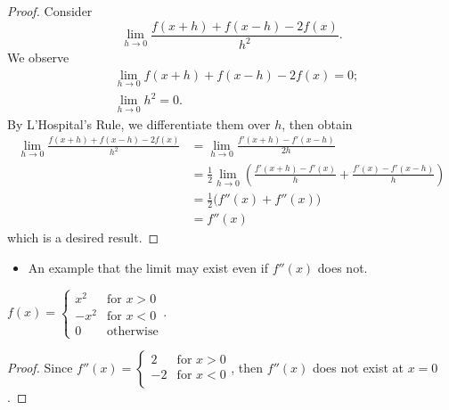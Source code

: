 \begin{Exercise}
	\begin{proof}
		Consider
		$$
		\lim_{h\to 0}\frac{f(x+h) + f(x-h) -2f(x)}{h^2}.
		$$
		We observe
		\begin{align*}
		&\lim_{h\to 0}f(x+h)+f(x-h)-2f(x) = 0; \\
		&\lim_{h\to 0}h^2 =0.
		\end{align*}
		By L'Hospital's Rule, we differentiate them over $h$, then obtain
		\begin{align*}
		\lim_{h\to 0}\frac{f(x+h) + f(x-h) -2f(x)}{h^2}
		&= \lim_{h\to 0}\frac{f'(x+h) - f'(x-h)}{2h} \\
		&= \frac{1}{2} \lim_{h\to 0}\left( \frac{f'(x+h)-f'(x)}{h} + \frac{f'(x) - f'(x-h)}{h} \right)\\
		&= \frac{1}{2} \big(f''(x) + f''(x) \big) \\
		&= f''(x)
		\end{align*}
		which is a desired result.
	\end{proof}
	\begin{itemize}
		\item An example that the limit may exist even if $f''(x)$ does not.
	\end{itemize}
	\begin{answer}
		$f(x) = \begin{cases}
		x^2 & \mbox{for } x > 0 \\
		-x^2 & \mbox{for } x < 0 \\
		0 & \mbox{otherwise}
		\end{cases}$.
	\end{answer}
	\begin{proof}
		Since $f''(x) = \begin{cases}
		2 & \mbox{for } x> 0 \\
		-2 & \mbox{for } x<0 \\
		\end{cases}$, then $f''(x)$ does not exist at $x=0$.
	\end{proof}
\end{Exercise}